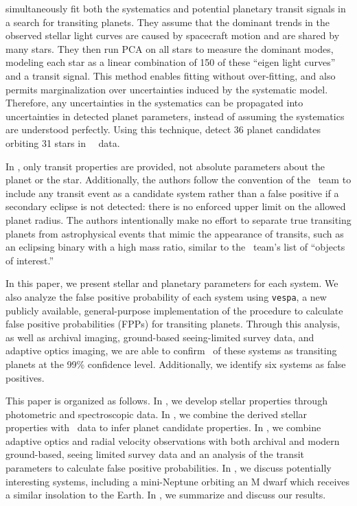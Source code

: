 \paperit{} simultaneously fit both the systematics and potential planetary transit signals
in a search for transiting planets.
They assume that the dominant trends in the observed stellar light
curves are caused by spacecraft motion and are shared by many stars.
They then run PCA on all stars to measure the dominant modes, modeling each star as a
linear combination of 150 of these ``eigen light curves'' and a transit signal.
This method enables fitting without over-fitting, and also permits marginalization over
uncertainties induced by the systematic model.
Therefore, any uncertainties in the systematics can be propagated into uncertainties in
detected planet parameters, instead of assuming the systematics are understood perfectly.
Using this technique, \paperit{} detect 36 planet candidates orbiting 31 stars in \KT\
\Ci\ data.

In \paperit, only transit properties are provided, not absolute parameters about the
planet or the star.
Additionally, the authors follow the convention of the \kep\ team to include any
transit event as a candidate system rather than a false positive if a secondary eclipse
is not detected: there is no enforced upper limit on the allowed planet radius.
The authors intentionally make no effort to separate true transiting planets from
astrophysical events that mimic the appearance of transits, such as an eclipsing
binary with a high mass ratio, similar to the \kep\ team's list of ``objects of interest.''


In this paper, we present stellar and planetary parameters for each system.
We also analyze the false positive probability of each system using \texttt{vespa},
a new publicly available, general-purpose implementation
of the \citet{Morton12} procedure
to calculate false positive probabilities (FPPs) for transiting planets.
Through this analysis, as well as archival imaging, ground-based
seeing-limited survey data, and adaptive optics imaging, we are able to confirm
\Nvalidated\ of these systems as transiting planets at the 99\% confidence
level.
Additionally, we identify six systems as false positives.

This paper is organized as follows.
In , we develop stellar properties through
photometric and spectroscopic data.
In , we combine the derived stellar properties with \KT\ data to infer planet
candidate properties.
In , we combine adaptive optics and radial velocity observations with both
archival and modern ground-based, seeing limited survey data and an analysis of the
transit parameters to calculate false positive probabilities.
In , we discuss potentially interesting systems, including a mini-Neptune
orbiting an M dwarf which receives a similar insolation to the Earth.
In \textsection6, we summarize and discuss our results.


